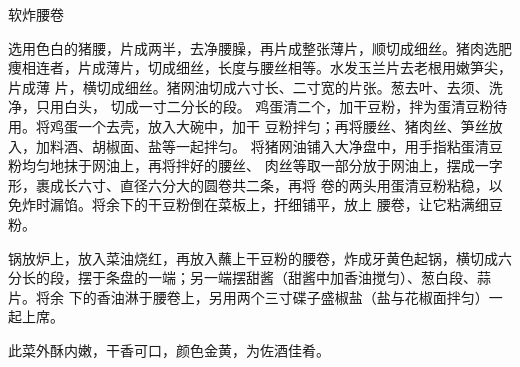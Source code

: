 \begin{recipe}{软炸腰卷}

\ingredients


\cooking

\step 选用色白的猪腰，片成两半，去净腰臊，再片成整张薄片，顺切成细丝。猪肉选肥
痩相连者，片成薄片，切成细丝，长度与腰丝相等。水发玉兰片去老根用嫩笋尖，片成薄
片，横切成细丝。猪网油切成六寸长、二寸宽的片张。葱去叶、去须、洗净，只用白头，
切成一寸二分长的段。
\step 鸡蛋清二个，加干豆粉，拌为蛋清豆粉待用。将鸡蛋一个去壳，放入大碗中，加干
豆粉拌匀；再将腰丝、猪肉丝、笋丝放入，加料酒、胡椒面、盐等一起拌匀。
\step 将猪网油铺入大净盘中，用手指粘蛋清豆粉均匀地抹于网油上，再将拌好的腰丝、
肉丝等取一部分放于网油上，摆成一字形，裹成长六寸、直径六分大的圆卷共二条，再将
卷的两头用蛋清豆粉粘稳，以免炸时漏馅。将余下的干豆粉倒在菜板上，扞细铺平，放上
腰卷，让它粘满细豆粉。

\step 锅放炉上，放入菜油烧红，再放入蘸上干豆粉的腰卷，炸成牙黄色起锅，横切成六
分长的段，摆于条盘的一端；另一端摆甜酱（甜酱中加香油搅匀）、葱白段、蒜片。将余
下的香油淋于腰卷上，另用两个三寸碟子盛椒盐（盐与花椒面拌匀）一起上席。

\features

此菜外酥内嫩，干香可口，颜色金黄，为佐酒佳肴。

\end{recipe}

